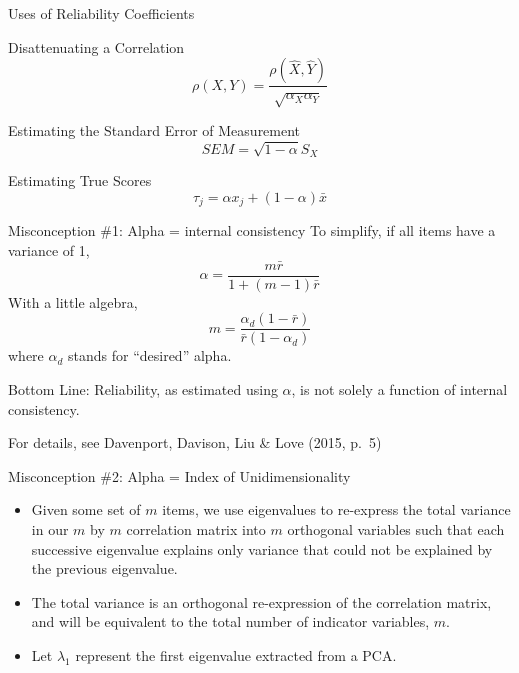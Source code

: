 \documentclass[
  ignorenonframetext,
]{beamer}
\begin{document}
\begin{frame}{Uses of Reliability Coefficients}
\protect\hypertarget{uses-of-reliability-coefficients}{}
\begin{block}{Disattenuating a Correlation}
\protect\hypertarget{disattenuating-a-correlation}{}
\[\rho(X,Y)=\frac{\rho(\hat{X},\hat{Y})}{\sqrt{{\alpha_X}{\alpha_Y}}}\]
\end{block}

\begin{block}{Estimating the Standard Error of Measurement}
\protect\hypertarget{estimating-the-standard-error-of-measurement}{}
\[SEM=\sqrt{1-\alpha}S_{X}\]
\end{block}

\begin{block}{Estimating True Scores}
\protect\hypertarget{estimating-true-scores}{}
\[\tau_j={\alpha}{x_j}+({1-\alpha}){\bar{x}}\]
\end{block}
\end{frame}

\begin{frame}{Misconception \#1: Alpha = internal consistency}
\protect\hypertarget{misconception-1-alpha-internal-consistency}{}
To simplify, if all items have a variance of 1,\\
\[\tag{11}\alpha=\frac{m\bar{r}}{1+(m-1)\bar{r}}\] With a little
algebra, \[m=\frac{\alpha_{d}(1-\bar{r})}{\bar{r}(1-\alpha_{d})}\] where
\(\alpha_{d}\) stands for ``desired'' alpha.

Bottom Line: Reliability, as estimated using \(\alpha\), is not solely a
function of internal consistency.

For details, see Davenport, Davison, Liu \& Love (2015, p.~5)
\end{frame}

\begin{frame}{Misconception \#2: Alpha = Index of Unidimensionality}
\protect\hypertarget{misconception-2-alpha-index-of-unidimensionality}{}
\begin{itemize}
\item
  Given some set of \(m\) items, we use eigenvalues to re-express the
  total variance in our \(m\) by \(m\) correlation matrix into \(m\)
  orthogonal variables such that each successive eigenvalue explains
  only variance that could not be explained by the previous eigenvalue.
\item
  The total variance is an orthogonal re-expression of the correlation
  matrix, and will be equivalent to the total number of indicator
  variables, \(m\).
\item
  Let \(\lambda_1\) represent the first eigenvalue extracted from a PCA.
\end{itemize}
\end{frame}
\end{document}
